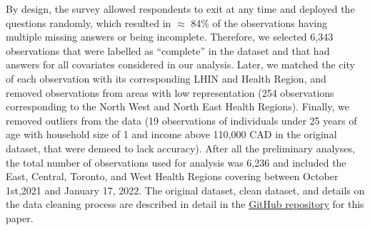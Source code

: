 \documentclass[
]{article}
\begin{document}
By design, the survey allowed respondents to exit at any time and
deployed the questions randomly, which resulted in \(\approx\) 84\% of
the observations having multiple missing answers or being incomplete.
Therefore, we selected 6,343 observations that were labelled as
``complete'' in the dataset and that had answers for all covariates
considered in our analysis. Later, we matched the city of each
observation with its corresponding LHIN and Health Region, and removed
observations from areas with low representation (254 observations
corresponding to the North West and North East Health Regions). Finally,
we removed outliers from the data (19 observations of individuals under
25 years of age with household size of 1 and income above 110,000 CAD in
the original dataset, that were demeed to lack accuracy). After all the
preliminary analyses, the total number of observations used for analysis
was 6,236 and included the East, Central, Toronto, and West Health
Regions covering between October 1st,2021 and January 17, 2022. The
original dataset, clean dataset, and details on the data cleaning
process are described in detail in the
\href{https://github.com/aimundo/Fields_COVID-19/}{GitHub repository}
for this paper.
\end{document}
